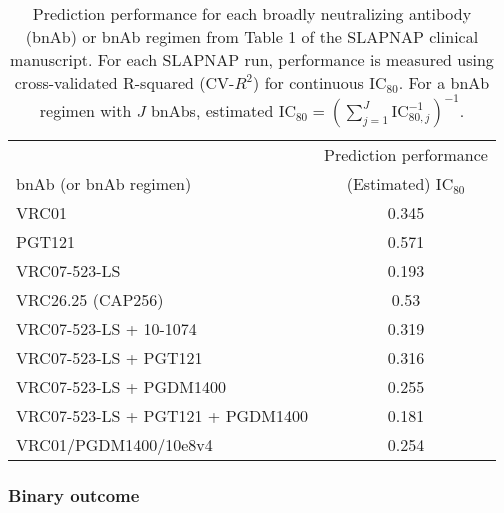 \documentclass[10pt]{article}
\begin{document}
\begin{table}
    \centering
    \caption{Prediction performance for each broadly neutralizing antibody (bnAb) or bnAb regimen from Table 1 of the SLAPNAP clinical manuscript. For each SLAPNAP run, performance is measured using cross-validated R-squared (CV-$R^2$) for continuous IC$_{80}$. For a bnAb regimen with $J$ bnAbs, estimated $\text{IC}_{80} = \left(\sum_{j=1}^J \text{IC}_{80,j}^{-1}\right)^{-1}$.}
    \begin{tabular}{l|c}
        & \multicolumn{1}{c}{Prediction performance} \\
        bnAb (or bnAb regimen) & (Estimated) IC$_{80}$ \\
        \hline
        VRC01 & 0.345  \\
        PGT121 & 0.571 \\
        VRC07-523-LS & 0.193 \\
        VRC26.25 (CAP256) & 0.53 \\
        VRC07-523-LS + 10-1074 & 0.319 \\
        VRC07-523-LS + PGT121 & 0.316 \\
        VRC07-523-LS + PGDM1400 & 0.255 \\
        VRC07-523-LS + PGT121 + PGDM1400 & 0.181 \\
        VRC01/PGDM1400/10e8v4 & 0.254
    \end{tabular}
    \label{tab:perf-continuous}
\end{table}

\subsubsection{Binary outcome}
\end{document}
